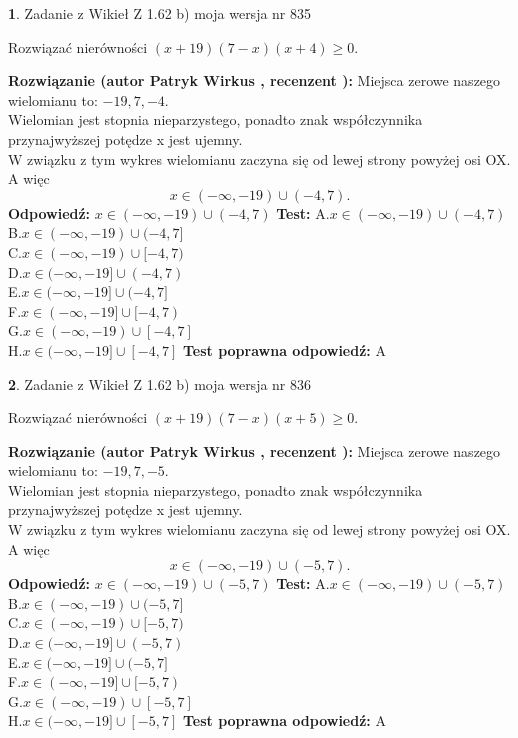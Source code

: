 \documentclass[12pt, a4paper]{article}
\theoremstyle{definition} %
\newtheorem{zad}{}
\newcommand{\zadStart}[1]{\begin{zad}#1\newline}
\newcommand{\zadStop}{\end{zad}}
\newcommand{\rozwStart}[2]{\noindent \textbf{Rozwiązanie (autor #1 , recenzent #2): }\newline}
\newcommand{\rozwStop}{\newline}
\newcommand{\odpStart}{\noindent \textbf{Odpowiedź:}\newline}
\newcommand{\odpStop}{\newline}
\newcommand{\testStart}{\noindent \textbf{Test:}\newline}
\newcommand{\testStop}{\newline}
\newcommand{\kluczStart}{\noindent \textbf{Test poprawna odpowiedź:}\newline}
\newcommand{\kluczStop}{\newline}
\begin{document}
\zadStart{Zadanie z Wikieł Z 1.62 b) moja wersja nr 835}

Rozwiązać nierówności $(x+19)(7-x)(x+4)\ge0$.
\zadStop
\rozwStart{Patryk Wirkus}{}
Miejsca zerowe naszego wielomianu to: $-19, 7, -4$.\\
Wielomian jest stopnia nieparzystego, ponadto znak współczynnika przy\linebreak najwyższej potędze x jest ujemny.\\ W związku z tym wykres wielomianu zaczyna się od lewej strony powyżej osi OX. A więc $$x \in (-\infty,-19) \cup (-4,7).$$
\rozwStop
\odpStart
$x \in (-\infty,-19) \cup (-4,7)$
\odpStop
\testStart
A.$x \in (-\infty,-19) \cup (-4,7)$\\
B.$x \in (-\infty,-19) \cup (-4,7]$\\
C.$x \in (-\infty,-19) \cup [-4,7)$\\
D.$x \in (-\infty,-19] \cup (-4,7)$\\
E.$x \in (-\infty,-19] \cup (-4,7]$\\
F.$x \in (-\infty,-19] \cup [-4,7)$\\
G.$x \in (-\infty,-19) \cup [-4,7]$\\
H.$x \in (-\infty,-19] \cup [-4,7]$
\testStop
\kluczStart
A
\kluczStop



\zadStart{Zadanie z Wikieł Z 1.62 b) moja wersja nr 836}

Rozwiązać nierówności $(x+19)(7-x)(x+5)\ge0$.
\zadStop
\rozwStart{Patryk Wirkus}{}
Miejsca zerowe naszego wielomianu to: $-19, 7, -5$.\\
Wielomian jest stopnia nieparzystego, ponadto znak współczynnika przy\linebreak najwyższej potędze x jest ujemny.\\ W związku z tym wykres wielomianu zaczyna się od lewej strony powyżej osi OX. A więc $$x \in (-\infty,-19) \cup (-5,7).$$
\rozwStop
\odpStart
$x \in (-\infty,-19) \cup (-5,7)$
\odpStop
\testStart
A.$x \in (-\infty,-19) \cup (-5,7)$\\
B.$x \in (-\infty,-19) \cup (-5,7]$\\
C.$x \in (-\infty,-19) \cup [-5,7)$\\
D.$x \in (-\infty,-19] \cup (-5,7)$\\
E.$x \in (-\infty,-19] \cup (-5,7]$\\
F.$x \in (-\infty,-19] \cup [-5,7)$\\
G.$x \in (-\infty,-19) \cup [-5,7]$\\
H.$x \in (-\infty,-19] \cup [-5,7]$
\testStop
\kluczStart
A
\kluczStop
\end{document}
